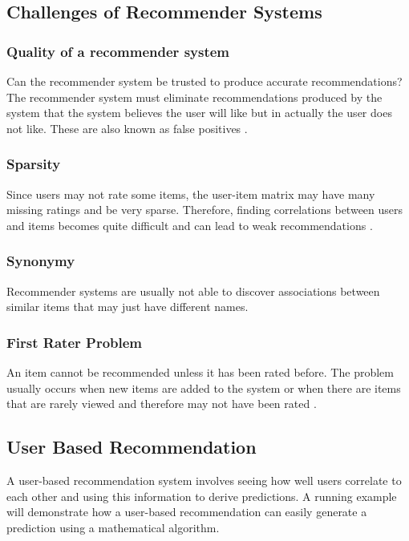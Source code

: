 \subsection{Challenges of Recommender Systems}
\subsubsection{Quality of a recommender system}
Can the recommender system be trusted to produce accurate recommendations? The recommender system must eliminate recommendations produced by the system that the system believes the user will like but in actually the user does not like. These are also known as false positives \citep{literature_5}.
\subsubsection{Sparsity}
Since users may not rate some items, the user-item matrix may have many missing ratings and be very sparse. Therefore, finding correlations between users and items becomes quite difficult and can lead to weak recommendations \citep{literature_6}. 
\subsubsection{Synonymy}
Recommender systems are usually not able to discover associations between similar items that may just have different names.
\subsubsection{First Rater Problem}
An item cannot be recommended unless it has been rated before. The problem usually occurs when new items are added to the system or when there are items that are rarely viewed and therefore may not have been rated \citep{literature_6}.

\subsection{User Based Recommendation}
A user-based recommendation system involves seeing how well users correlate to each other and using this information to derive predictions. A running example will demonstrate how a user-based recommendation can easily generate a prediction using a mathematical algorithm.

